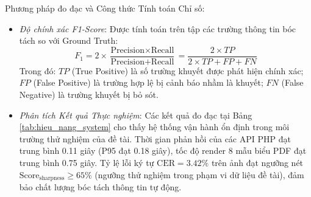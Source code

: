 \documentclass[12pt,a4paper]{report}
\begin{document}
Phương pháp đo đạc và Công thức Tính toán Chỉ số:
\begin{itemize}[label=--,leftmargin=*]
  \item \textit{Độ chính xác F1-Score}: Được tính toán trên tập các trường thông tin bóc tách so với Ground Truth:
        \begin{equation}
          F_1 = 2 \times \frac{\text{Precision} \times \text{Recall}}{\text{Precision} + \text{Recall}} = \frac{2 \times TP}{2 \times TP + FP + FN}
        \end{equation}
        Trong đó: $TP$ (True Positive) là số trường khuyết được phát hiện chính xác; $FP$ (False Positive) là trường hợp lệ bị cảnh báo nhầm là khuyết; $FN$ (False Negative) là trường khuyết bị bỏ sót.
  \item \textit{Phân tích Kết quả Thực nghiệm}: Các kết quả đo đạc tại Bảng \ref{tab:hieu_nang_system} cho thấy hệ thống vận hành ổn định trong môi trường thử nghiệm của đề tài. Thời gian phản hồi của các API PHP đạt trung bình 0.11 giây (P95 đạt 0.18 giây), tốc độ render 8 mẫu biểu PDF đạt trung bình 0.75 giây. Tỷ lệ lỗi ký tự $\text{CER} = 3.42\%$ trên ảnh đạt ngưỡng nét $\text{Score}_{\text{sharpness}} \ge 65\%$ (ngưỡng thử nghiệm trong phạm vi dữ liệu đề tài), đảm bảo chất lượng bóc tách thông tin tự động.
\end{itemize}
\end{document}
